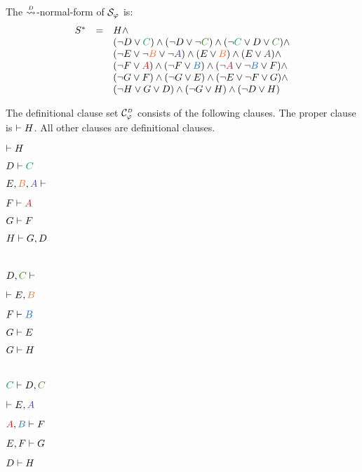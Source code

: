 \begin{example}
\noindent
The $\normalizePlusTimesD$-normal-form of $\mathcal{S}_{\varphi}$ is:
$$
\begin{array}{rcl}
S^*	
& \defEq & H \structplus \\
&			& 
(\structdual D \structtimes \hE{C})
\structplus
(\structdual D \structtimes \structdual \hF{C})
\structplus
( \structdual \hE{C} \structtimes D \structtimes \hF{C}) \structplus \\
&			&
(\structdual E \structtimes \structdual \hC{B} \structtimes \structdual \hD{A} )
\structplus
(E \structtimes \hC{B})
\structplus
(E \structtimes \hD{A}) \structplus \\
&			&
(\structdual F \structtimes \hA{A})
\structplus
(\structdual F \structtimes \hB{B})
\structplus
(\structdual \hA{A} \structtimes \structdual \hB{B} \structtimes F) \structplus \\
&			&
(\structdual G \structtimes F)
\structplus
(\structdual G \structtimes E)
\structplus
(\structdual E \structtimes \structdual F \structtimes G) \structplus \\
&			&
(\structdual H \structtimes G \structtimes D)
\structplus
(\structdual G \structtimes H)
\structplus
(\structdual D \structtimes H) \\
\end{array}
$$

\noindent
The definitional clause set $\clausesetDefinitional{\varphi}$ consists of the following clauses. The proper clause is $\vdash H$. All other clauses are definitional clauses.

\begin{multicols}{3}{
{
$\vdash H$

$D \seq \hE{C}$

$E, \hC{B}, \hD{A} \seq $

$F \seq \hA{A}$

$G \vdash F$

$H \vdash G, D$
}

{
$\phantom{\seq H}$

$D, \hF{C} \seq $

$\seq E, \hC{B}$

$F \seq \hB{B}$

$G \vdash E$

$G \vdash H$
}

{
$\phantom{\seq H}$

$ \hE{C} \seq D, \hF{C}$

$\seq E, \hD{A}$

$\hA{A}, \hB{B} \seq F$

$E, F \vdash G$

$D \vdash H$
}
}\end{multicols}
\hfill\QED
\end{example}

